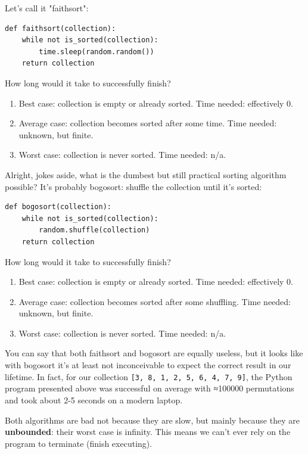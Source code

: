 \documentclass[a4paper, justified, notitlepage, sfsidenotes, notoc]{tufte-book}
\begin{document}
Let's call it "faithsort":

\begin{verbatim}
def faithsort(collection):
    while not is_sorted(collection):
        time.sleep(random.random())
    return collection
\end{verbatim}

How long would it take to successfully finish?

\begin{enumerate}
\item Best case: collection is empty or already sorted. Time needed: effectively 0.
\item Average case: collection becomes sorted after some time. Time needed: unknown, but finite.
\item Worst case: collection is never sorted. Time needed: n/a.
\end{enumerate}

Alright, jokes aside, what is the dumbest but still practical sorting algorithm possible? It's probably bogosort: shuffle the collection until it's sorted:

\begin{verbatim}
def bogosort(collection):
    while not is_sorted(collection):
        random.shuffle(collection)
    return collection
\end{verbatim}

How long would it take to successfully finish?

\begin{enumerate}
\item Best case: collection is empty or already sorted. Time needed: effectively 0.
\item Average case: collection becomes sorted after some shuffling. Time needed: unknown, but finite.
\item Worst case: collection is never sorted. Time needed: n/a.
\end{enumerate}

You can say that both faithsort and bogosort are equally useless, but it looks like with bogosort it's at least not inconceivable to expect the correct result in our lifetime. In fact, for our collection \texttt{[3, 8, 1, 2, 5, 6, 4, 7, 9]}, the Python program presented above was successful on average with ≈100000 permutations and took about 2-5 seconds on a modern laptop.

Both algorithms are bad not because they are slow, but mainly because they are \textbf{unbounded}: their worst case is infinity. This means we can't ever rely on the program to terminate (finish executing).
\end{document}
